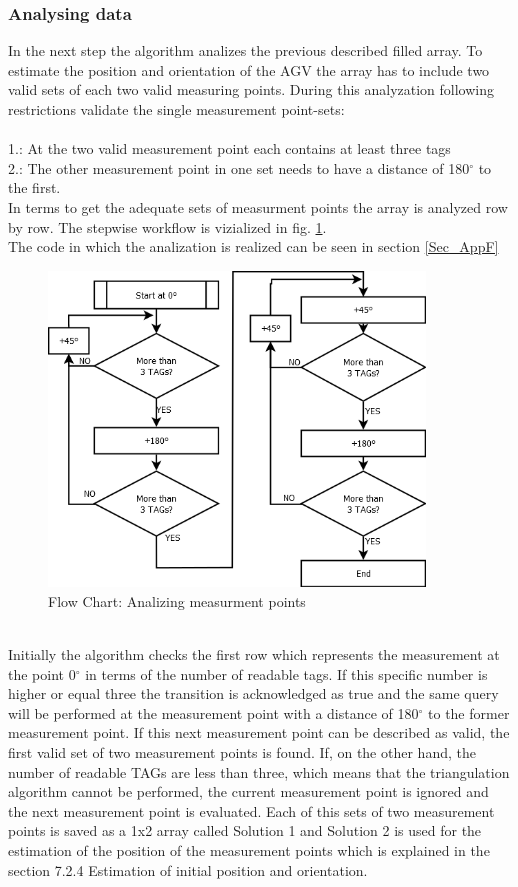 \subsubsection{Analysing data}
In the next step  the algorithm analizes the previous described filled array. To estimate the position and orientation of the AGV the array has to include two valid sets of each two valid measuring points.  During this analyzation following restrictions validate the single measurement point-sets:\\\\
1.: At the two valid measurement point each contains at least three tags\\
2.: The other measurement point in one set needs to have a distance of 180$^\circ$  to the first.
\pagebreak\\
In terms to get the adequate sets of measurment points the array is analyzed row by row. The stepwise workflow is vizialized in fig. \ref{Analyze_Array}.\\
The code in which the analization is realized can be seen in section \ref{Sec_AppF}
\begin{figure}[!htbp]
\centering
\includegraphics[width = 10cm]{Pictures/AnalyzeArray}
\caption{Flow Chart: Analizing measurment points}
\label{Analyze_Array}
\end{figure}\\
Initially the algorithm checks the first row which represents the measurement at the point 0$^\circ$ in terms of the number of readable tags. If this specific number is higher or equal three the transition is acknowledged as true and the same query will be performed at the measurement point with a distance of 180$^\circ$ to the former measurement point. If this next measurement point can be described as valid, the first valid set of two measurement points is found. If, on the other hand, the number of readable TAGs are less than three, which means that the triangulation algorithm cannot be performed, the current measurement point is ignored and the next measurement point is evaluated.
Each of this sets of two measurement points is saved as a 1x2 array called Solution 1 and Solution 2 is used for the estimation of the position of the measurement points which is explained in the section 7.2.4 Estimation of initial position and orientation.\\

